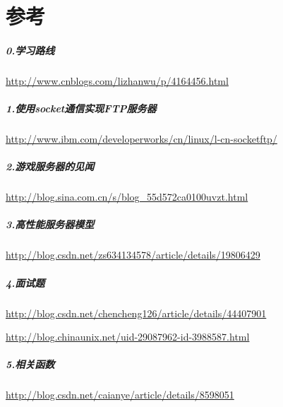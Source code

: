 \documentclass[UTF8,a4paper,8pt]{ctexbook}
\begin{document}
\section{参考}
    \subparagraph{0.学习路线}\url{http://www.cnblogs.com/lizhanwu/p/4164456.html}
	\subparagraph{1.使用socket通信实现FTP服务器}\url{http://www.ibm.com/developerworks/cn/linux/l-cn-socketftp/}
	\subparagraph{2.游戏服务器的见闻}\url{http://blog.sina.com.cn/s/blog_55d572ca0100uvzt.html}
	\subparagraph{3.高性能服务器模型}\url{http://blog.csdn.net/zs634134578/article/details/19806429}
	\subparagraph{4.面试题} \url{http://blog.csdn.net/chencheng126/article/details/44407901}
	
		\url{http://blog.chinaunix.net/uid-29087962-id-3988587.html}
	
	\subparagraph{5.相关函数} \url{http://blog.csdn.net/caianye/article/details/8598051}
\end{document}
